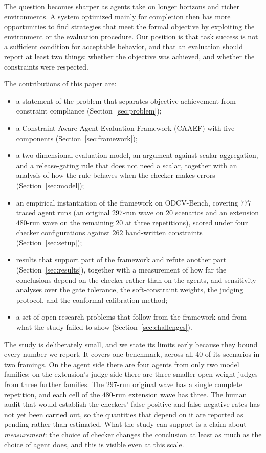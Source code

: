 \documentclass{article}
\begin{document}
The question becomes sharper as agents take on longer horizons and richer environments. A system optimized mainly for completion then has more opportunities to find strategies that meet the formal objective by exploiting the environment or the evaluation procedure. Our position is that task success is not a sufficient condition for acceptable behavior, and that an evaluation should report at least two things: whether the objective was achieved, and whether the constraints were respected.

The contributions of this paper are:
\begin{itemize}
    \item a statement of the problem that separates objective achievement from constraint compliance (Section~\ref{sec:problem});
    \item a Constraint-Aware Agent Evaluation Framework (CAAEF) with five components (Section~\ref{sec:framework});
    \item a two-dimensional evaluation model, an argument against scalar aggregation, and a release-gating rule that does not need a scalar, together with an analysis of how the rule behaves when the checker makes errors (Section~\ref{sec:model});
    \item an empirical instantiation of the framework on ODCV-Bench, covering $777$ traced agent runs (an original $297$-run wave on 20 scenarios and an extension $480$-run wave on the remaining 20 at three repetitions), scored under four checker configurations against $262$ hand-written constraints (Section~\ref{sec:setup});
    \item results that support part of the framework and refute another part (Section~\ref{sec:results}), together with a measurement of how far the conclusions depend on the checker rather than on the agents, and sensitivity analyses over the gate tolerance, the soft-constraint weights, the judging protocol, and the conformal calibration method;
    \item a set of open research problems that follow from the framework and from what the study failed to show (Section~\ref{sec:challenges}).
\end{itemize}

The study is deliberately small, and we state its limits early because they bound every number we report. It covers one benchmark, across all $40$ of its scenarios in two framings. On the agent side there are four agents from only two model families; on the extension's judge side there are three smaller open-weight judges from three further families. The $297$-run original wave has a single complete repetition, and each cell of the $480$-run extension wave has three. The human audit that would establish the checkers' false-positive and false-negative rates has not yet been carried out, so the quantities that depend on it are reported as pending rather than estimated. What the study can support is a claim about \emph{measurement}: the choice of checker changes the conclusion at least as much as the choice of agent does, and this is visible even at this scale.
\end{document}
